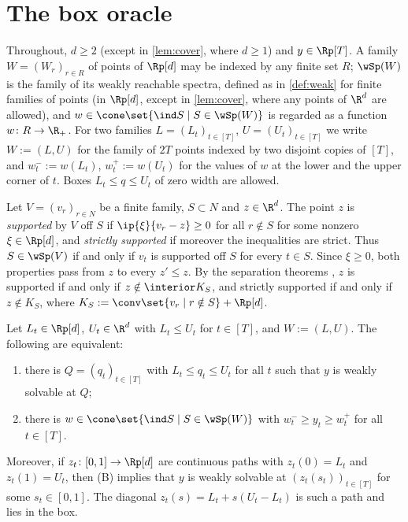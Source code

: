 \section{The box oracle}\label{sec:corners}

Throughout, $d\ge2$ (except in \cref{lem:cover}, where $d\ge1$) and $y\in\Rp[T]$. A family $W=(W_r)_{r\in R}$ of points of $\Rp[d]$ may be indexed by any finite set $R$; $\wSp(W)$ is the family of its weakly reachable spectra, defined as in \cref{def:weak} for finite families of points (in $\Rp[d]$, except in \cref{lem:cover}, where any points of $\R^d$ are allowed), and $w\in\cone\set{\ind S\mid S\in\wSp(W)}$ is regarded as a function $w\colon R\to\R_+$. For two families $L=(L_t)_{t\in[T]}$, $U=(U_t)_{t\in[T]}$ we write $W:=(L,U)$ for the family of $2T$ points indexed by two disjoint copies of $[T]$, and $w^-_t:=w(L_t)$, $w^+_t:=w(U_t)$ for the values of $w$ at the lower and the upper corner of $t$. Boxes $L_t\le q\le U_t$ of zero width are allowed.

Let $V=(v_r)_{r\in N}$ be a finite family, $S\subset N$ and $z\in\R^d$. The point $z$ is \emph{supported} by $V$ off $S$ if $\ip{\xi}{v_r-z}\ge0$ for all $r\notin S$ for some nonzero $\xi\in\Rp[d]$, and \emph{strictly supported} if moreover the inequalities are strict. Thus $S\in\wSp(V)$ if and only if $v_t$ is supported off $S$ for every $t\in S$. Since $\xi\ge0$, both properties pass from $z$ to every $z'\le z$. By the separation theorems \citep[Thms.~11.3, 11.4]{Rockafellar1970}, $z$ is supported if and only if $z\notin\interior K_S$, and strictly supported if and only if $z\notin K_S$, where $K_S:=\conv\set{v_r\mid r\notin S}+\Rp[d]$.

\begin{theorem}[corners]\label{thm:corners}
Let $L_t\in\Rp[d]$, $U_t\in\R^d$ with $L_t\le U_t$ for $t\in[T]$, and $W:=(L,U)$. The following are equivalent:
\begin{enumerate}[label=(\Alph*)]
\item there is $Q=(q_t)_{t\in[T]}$ with $L_t\le q_t\le U_t$ for all $t$ such that $y$ is weakly solvable at $Q$;
\item there is $w\in\cone\set{\ind S\mid S\in\wSp(W)}$ with $w^-_t\ge y_t\ge w^+_t$ for all $t\in[T]$.
\end{enumerate}
Moreover, if $z_t\colon[0,1]\to\Rp[d]$ are continuous paths with $z_t(0)=L_t$ and $z_t(1)=U_t$, then (B) implies that $y$ is weakly solvable at $(z_t(s_t))_{t\in[T]}$ for some $s_t\in[0,1]$. The diagonal $z_t(s)=L_t+s(U_t-L_t)$ is such a path and lies in the box.
\end{theorem}

